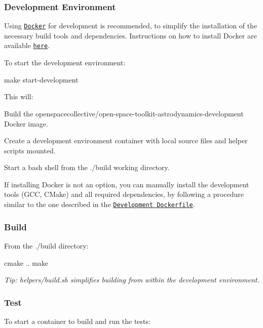 \subsubsection*{Development Environment}

Using \href{https://www.docker.com}{\tt Docker} for development is recommended, to simplify the installation of the necessary build tools and dependencies. Instructions on how to install Docker are available \href{https://docs.docker.com/install/}{\tt here}.

To start the development environment\+:


\begin{DoxyCode}
make start-development
\end{DoxyCode}


This will\+:


\begin{DoxyEnumerate}
\item Build the {\ttfamily openspacecollective/open-\/space-\/toolkit-\/astrodynamics-\/development} Docker image.
\item Create a development environment container with local source files and helper scripts mounted.
\item Start a {\ttfamily bash} shell from the {\ttfamily ./build} working directory.
\end{DoxyEnumerate}

If installing Docker is not an option, you can manually install the development tools (G\+CC, C\+Make) and all required dependencies, by following a procedure similar to the one described in the \href{./docker/development/Dockerfile}{\tt Development Dockerfile}.

\subsubsection*{Build}

From the {\ttfamily ./build} directory\+:


\begin{DoxyCode}
cmake ..
make
\end{DoxyCode}


{\itshape Tip\+: {\ttfamily helpers/build.\+sh} simplifies building from within the development environment.}

\subsubsection*{Test}

To start a container to build and run the tests\+:


